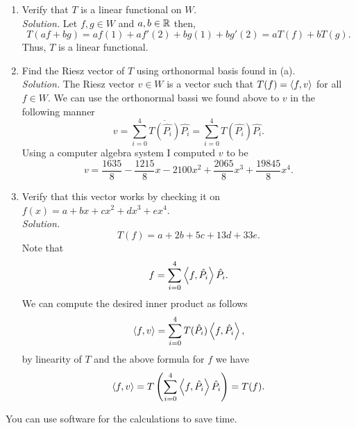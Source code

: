 \documentclass[12pt]{article}
\begin{document}
\begin{enumerate}
\begin{enumerate}
		\item[(c1)] Verify that \(T\) is a linear functional on \(W\).\\
		\textit{Solution.}
		Let $f,g\in W$ and $a,b\in \mathbb{R}$ then, 
		\[
			T(af+bg)=af(1)+af'(2)+bg(1)+bg'(2)=aT(f)+bT(g).
		\]
		Thus, $T$ is a linear functional. 
		\item[(c2)] Find the Riesz vector of \(T\) using orthonormal basis found in (a).\\
		\textit{Solution.} The Riesz vector $v\in W$ is a vector such that $T(f)=\left\langle f, v \right\rangle$ for all $f\in W$. We can use the orthonormal bassi we found above to $v$ in the following manner
		\[
			v=\sum_{i=0}^{4}\overline{T(\hat{P_i})}\hat{P_i}=\sum_{i=0}^{4}T(\hat{P_i})\hat{P_i}.
		\]
		Using a computer algebra system I computed $v$ to be
		\[
			v=\frac{1635}{8}-\frac{1215}{8}x-2100x^2+\frac{2065}{8}x^3+\frac{19845}{8}x^4.
		\]
		\newpage
		\item[(c3)] Verify that this vector works by checking it on \(f(x) = a + bx + cx^{2} + dx^{3} + ex^{4}\).\\
		\textit{Solution.}
		\[
			T(f)=a+2b+5c+13d+33e.
		\]
		Note that 
		\[
			f=\sum_{i=0}^{4}\left\langle f, \hat{P_i} \right\rangle\hat{P_i}.
		\]
		We can compute the desired inner product as follows
		\[
			\left\langle f, v \right\rangle=\sum_{i=0}^{4}T(\hat{P_i})\left\langle f, \hat{P_i} \right\rangle,
		\]
		by linearity of $T$ and the above formula for $f$ we have
		\[
			\left\langle f, v \right\rangle=T\left(\sum_{i=0}^{4}\left\langle f, \hat{P_i} \right\rangle\hat{P_i}\right)=T(f).
		\]
	\end{enumerate}
\end{enumerate}
You can use software for the calculations to save time.

\end{document}
